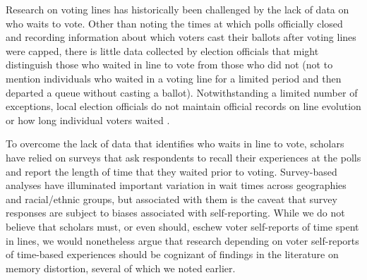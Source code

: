 \documentclass[12pt,titlepage]{article}
\begin{document}
Research on voting lines has historically been challenged by the lack
of data on who waits to vote.  Other than noting the times at which
polls officially closed and recording information about which voters
cast their ballots after voting lines were capped, there is little
data collected by election officials that might distinguish those who
waited in line to vote from those who did not (not to mention
individuals who waited in a voting line for a limited period and then
departed a queue without casting a ballot).  Notwithstanding a limited
number of exceptions, local election officials do not maintain
official records on line evolution or how long individual voters
waited \citep{herron:confidence}.


To overcome the lack of data that identifies who waits in line to
vote, scholars have relied on surveys that ask respondents to recall
their experiences at the polls and report the length of time that they
waited prior to voting.  Survey-based analyses have illuminated
important variation in wait times across geographies and racial/ethnic
groups, but associated with them is the caveat that survey responses
are subject to biases associated with self-reporting.  While we do not
believe that scholars must, or even should, eschew voter self-reports
of time spent in lines, we would nonetheless argue that research
depending on voter self-reports of time-based experiences should be
cognizant of findings in the literature on memory distortion, several
of which we noted earlier.


\end{document}

